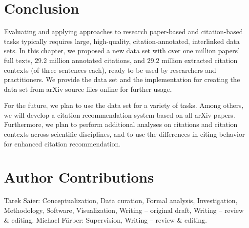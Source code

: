 \section{Conclusion}
\label{sec:conclusion}

Evaluating and applying approaches to research paper-based and citation-based tasks typically requires large, high-quality, citation-annotated, interlinked data sets. In this chapter, we proposed a new data set with over one million papers' full texts, 29.2 million annotated citations, and 29.2 million extracted citation contexts (of three sentences each), ready to be used by researchers and practitioners.
We provide the data set and the implementation for creating the data set from arXiv source files online for further usage.

For the future, we plan to use the data set for a variety of tasks. Among others, we will develop a citation recommendation system based on all arXiv papers. Furthermore, we plan to perform additional analyses on citations and citation contexts across scientific disciplines, and to use the differences in citing behavior for enhanced citation recommendation.

\section*{Author Contributions}  %
Tarek Saier: Conceptualization, Data curation, Formal analysis, Investigation, Methodology, Software, Visualization, Writing -- original draft, Writing -- review \& editing. Michael F{\"a}rber: Supervision, Writing -- review \& editing.
